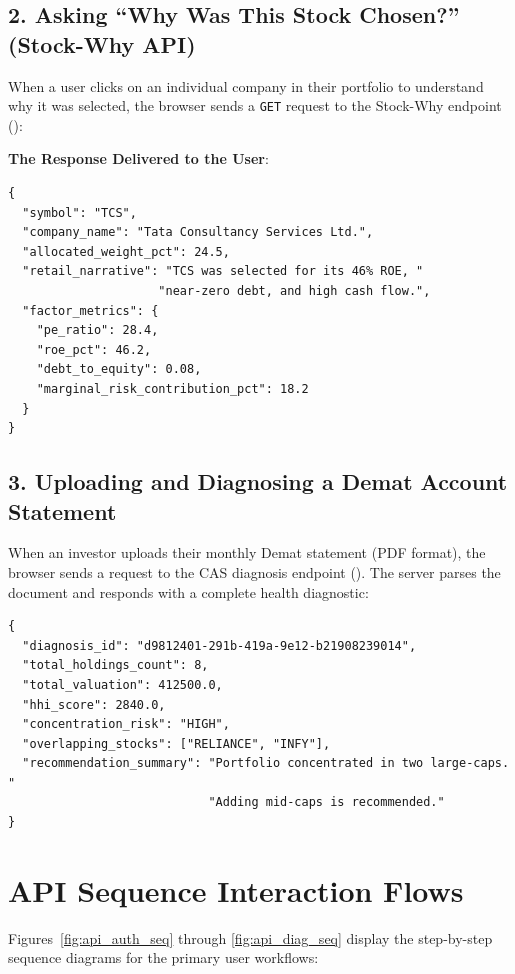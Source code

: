 \subsection{2. Asking ``Why Was This Stock Chosen?'' (Stock-Why API)}
When a user clicks on an individual company in their portfolio to understand why it was selected, the browser sends a \texttt{GET} request to the Stock-Why endpoint ():

\noindent \textbf{The Response Delivered to the User}:
\begin{footnotesize}
\begin{verbatim}
{
  "symbol": "TCS",
  "company_name": "Tata Consultancy Services Ltd.",
  "allocated_weight_pct": 24.5,
  "retail_narrative": "TCS was selected for its 46% ROE, "
                     "near-zero debt, and high cash flow.",
  "factor_metrics": {
    "pe_ratio": 28.4,
    "roe_pct": 46.2,
    "debt_to_equity": 0.08,
    "marginal_risk_contribution_pct": 18.2
  }
}
\end{verbatim}
\end{footnotesize}

\subsection{3. Uploading and Diagnosing a Demat Account Statement}
When an investor uploads their monthly Demat statement (PDF format), the browser sends a  request to the CAS diagnosis endpoint (). The server parses the document and responds with a complete health diagnostic:
\begin{footnotesize}
\begin{verbatim}
{
  "diagnosis_id": "d9812401-291b-419a-9e12-b21908239014",
  "total_holdings_count": 8,
  "total_valuation": 412500.0,
  "hhi_score": 2840.0,
  "concentration_risk": "HIGH",
  "overlapping_stocks": ["RELIANCE", "INFY"],
  "recommendation_summary": "Portfolio concentrated in two large-caps. "
                            "Adding mid-caps is recommended."
}
\end{verbatim}
\end{footnotesize}

\section{API Sequence Interaction Flows}
Figures~\ref{fig:api_auth_seq} through \ref{fig:api_diag_seq} display the step-by-step sequence diagrams for the primary user workflows:

